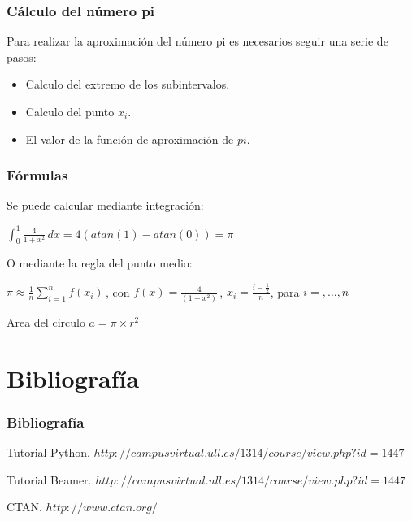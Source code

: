 \documentclass{beamer}
\begin{document}
\begin{frame}

\frametitle{Cálculo del número pi}

\begin{block}{}
Para realizar la aproximación del número pi es necesarios seguir una serie de pasos:
  \begin{itemize}
  \item
  Calculo del extremo de los subintervalos.
  \pause

  \item
  Calculo del punto $x_i$.
  \pause

  \item
  El valor de la función de aproximación de $pi$.

  \end{itemize}
\end{block}

\end{frame}

\begin{frame}
\frametitle{Fórmulas}
Se puede calcular mediante integración:

$\int_{0}^{1} \! \frac{4}{1+x^2}\, dx = 4(atan(1) -atan(0)) = \pi $


O mediante la regla del punto medio:


$\pi \approx \frac{1}{n} \sum\limits_{i=1}^{n}f(x_i)\,$,
con $f(x) = \frac{4}{(1+x^2)}\,$,
$x_i = \frac{i - \frac{1}{2}}{n}$,
para $i = , \dots, n$

Area del circulo $a = \pi \times r^2$



\end{frame}

\section{Bibliografía}
\begin{frame}
  \frametitle{Bibliografía}

  \begin{thebibliography}{10}

    \beamertemplatebookbibitems
    Tutorial Python.
    {\small $http://campusvirtual.ull.es/1314/course/view.php?id=1447$}

    \beamertemplatebookbibitems
    Tutorial Beamer.
    {\small $http://campusvirtual.ull.es/1314/course/view.php?id=1447$}

    \beamertemplatebookbibitems
    CTAN. {\small $http://www.ctan.org/$}

  \end{thebibliography}
\end{frame}
\end{document}
